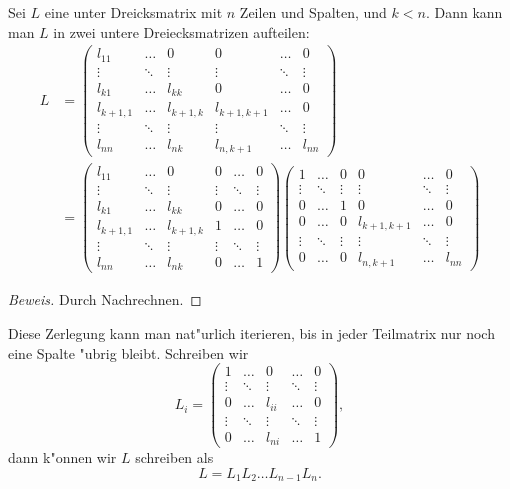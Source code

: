\begin{hilfssatz}
Sei $L$ eine unter Dreicksmatrix mit $n$ Zeilen und Spalten, und $k<n$.
Dann kann man $L$ in zwei untere Dreiecksmatrizen aufteilen:
\begin{align*}
L&=
\begin{pmatrix}
l_{11}   &\dots &0        &0          &\dots &0     \\
\vdots   &\ddots&\vdots   &\vdots     &\ddots&\vdots\\
l_{k1}   &\dots &l_{kk}   &0          &\dots &0     \\
l_{k+1,1}&\dots &l_{k+1,k}&l_{k+1,k+1}&\dots &0     \\
\vdots   &\ddots&\vdots   &\vdots     &\ddots&\vdots\\
l_{nn}   &\dots &l_{nk}   &l_{n,k+1}  &\dots &l_{nn}
\end{pmatrix}
\\
&=
\begin{pmatrix}
l_{11}   &\dots &0        &0          &\dots &0     \\
\vdots   &\ddots&\vdots   &\vdots     &\ddots&\vdots\\
l_{k1}   &\dots &l_{kk}   &0          &\dots &0     \\
l_{k+1,1}&\dots &l_{k+1,k}&1          &\dots &0     \\
\vdots   &\ddots&\vdots   &\vdots     &\ddots&\vdots\\
l_{nn}   &\dots &l_{nk}   &0          &\dots &1
\end{pmatrix}
\begin{pmatrix}
1        &\dots &0        &0          &\dots &0     \\
\vdots   &\ddots&\vdots   &\vdots     &\ddots&\vdots\\
0        &\dots &1        &0          &\dots &0     \\
0        &\dots &0        &l_{k+1,k+1}&\dots &0     \\
\vdots   &\ddots&\vdots   &\vdots     &\ddots&\vdots\\
0        &\dots &0        &l_{n,k+1}  &\dots &l_{nn}
\end{pmatrix}
\end{align*}
\end{hilfssatz}

\begin{proof}[Beweis]
Durch Nachrechnen.
\end{proof}

Diese Zerlegung kann man nat"urlich iterieren, bis in jeder Teilmatrix
nur noch eine Spalte "ubrig bleibt.
Schreiben wir
\[
L_i=\begin{pmatrix}
1      &\dots &0     &\dots &0     \\
\vdots &\ddots&\vdots&\ddots&\vdots\\
0      &\dots &l_{ii}&\dots &0     \\
\vdots &\ddots&\vdots&\ddots&\vdots\\
0      &\dots &l_{ni}&\dots &1
\end{pmatrix},
\]
dann k"onnen wir $L$ schreiben als
\begin{equation}
L=L_1L_2\dots L_{n-1}L_n.
\label{lproductdecomposition}
\end{equation}

